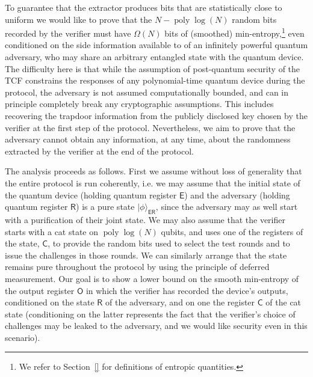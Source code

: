 \documentclass[11pt]{article}
\theoremstyle{remark}
\theoremstyle{definition}
\newcommand{\ket}[1]{|#1\rangle}
\newcommand{\reg}[1]{{\textsf{#1}}}
\DeclareMathOperator{\poly}{poly}
\begin{document}
To guarantee that the extractor produces bits that are statistically close to uniform we would like to prove that the $N - \poly\log(N)$ random bits recorded by the verifier must have  $\Omega(N)$ bits of (smoothed) min-entropy,\footnote{We refer to Section~\ref{} for definitions of entropic quantities.} even conditioned on the side information available to of an infinitely powerful quantum adversary, who may share an arbitrary entangled state with
the quantum device. The difficulty here is that while the assumption of  post-quantum security of the TCF constrains the responses of any polynomial-time quantum device during the
protocol, the adversary is not assumed computationally bounded, and can in principle completely break any cryptographic assumptions. This includes recovering the trapdoor information from the publicly disclosed key chosen by the verifier at the first step of the protocol. Nevertheless, we aim to prove that the adversary cannot obtain any information, at any time, about the randomness extracted by the verifier at the end of the protocol. 

The analysis proceeds as follows. First we assume without loss of generality that the entire protocol is run coherently, i.e. we may
assume that the initial state of the quantum device (holding quantum register $\reg{E}$) and the adversary (holding quantum register $\reg{R}$)
is a pure state $\ket{\phi}_\reg{ER}$, since the adversary may as well start with a purification of their joint state. We may also assume that the verifier 
starts with a cat state on $\poly\log(N)$ qubits, and uses one of the registers of the state, $\reg{C}$, to provide the random bits used to select the test rounds and to issue the challenges in those rounds. We can similarly  arrange that 
the state remains pure throughout the protocol by using the principle of deferred measurement. Our goal is to show a lower bound on the smooth
min-entropy of the output register $\reg{O}$ in which the verifier has recorded the device's outputs, conditioned on the state $\reg{R}$ of the adversary, and on one the register $\reg{C}$ of the cat state  (conditioning on the latter represents the fact that the verifier's choice of challenges may be leaked to the adversary, and we would like security even in this scenario). 
\end{document}
